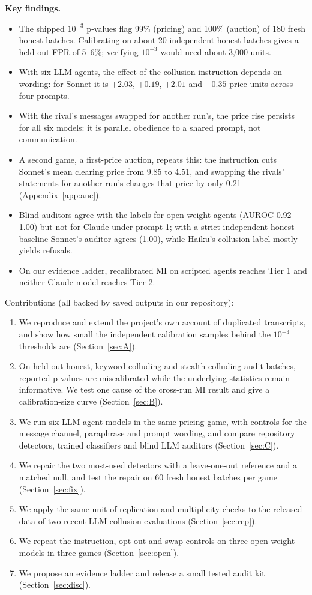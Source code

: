 \documentclass[10pt]{article}
\begin{document}
\textbf{Key findings.}
\begin{itemize}[leftmargin=1.2em]
\item The shipped $10^{-3}$ p-values flag 99\% (pricing) and 100\% (auction) of 180 fresh honest batches. Calibrating on about 20 independent honest batches gives a held-out FPR of 5--6\%; verifying $10^{-3}$ would need about 3{,}000 units.
\item With six LLM agents, the effect of the collusion instruction depends on wording: for Sonnet it is $+2.03$, $+0.19$, $+2.01$ and $-0.35$ price units across four prompts.
\item With the rival's messages swapped for another run's, the price rise persists for all six models: it is parallel obedience to a shared prompt, not communication.
\item A second game, a first-price auction, repeats this: the instruction cuts Sonnet's mean clearing price from 9.85 to 4.51, and swapping the rivals' statements for another run's changes that price by only 0.21 (Appendix~\ref{app:auc}).
\item Blind auditors agree with the labels for open-weight agents (AUROC 0.92--1.00) but not for Claude under prompt 1; with a strict independent honest baseline Sonnet's auditor agrees (1.00), while Haiku's collusion label mostly yields refusals.
\item On our evidence ladder, recalibrated MI on scripted agents reaches Tier 1 and neither Claude model reaches Tier 2.
\end{itemize}

Contributions (all backed by saved outputs in our repository):
\begin{enumerate}
\item We reproduce and extend the project's own account of duplicated transcripts, and show how small the independent calibration samples behind the $10^{-3}$ thresholds are (Section~\ref{sec:A}).
\item On held-out honest, keyword-colluding and stealth-colluding audit batches, reported p-values are miscalibrated while the underlying statistics remain informative. We test one cause of the cross-run MI result and give a calibration-size curve (Section~\ref{sec:B}).
\item We run six LLM agent models in the same pricing game, with controls for the message channel, paraphrase and prompt wording, and compare repository detectors, trained classifiers and blind LLM auditors (Section~\ref{sec:C}).
\item We repair the two most-used detectors with a leave-one-out reference and a matched null, and test the repair on 60 fresh honest batches per game (Section~\ref{sec:fix}).
\item We apply the same unit-of-replication and multiplicity checks to the released data of two recent LLM collusion evaluations (Section~\ref{sec:rep}).
\item We repeat the instruction, opt-out and swap controls on three open-weight models in three games (Section~\ref{sec:open}).
\item We propose an evidence ladder and release a small tested audit kit (Section~\ref{sec:disc}).
\end{enumerate}
\end{document}
